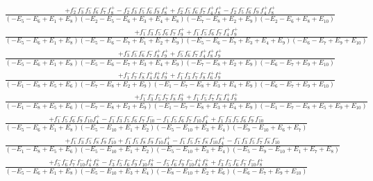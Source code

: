 \documentclass{article}
\begin{document}
\[\begin{array}{rcl}
\frac{+f_{2}^{-}f_{3}^{-}f_{5}^{-}f_{6}^{-}f_{7}^{-}f_{8}^{+}-f_{2}^{-}f_{3}^{-}f_{5}^{-}f_{6}^{-}f_{9}^{-}f_{8}^{+}+f_{2}^{-}f_{5}^{-}f_{6}^{-}f_{7}^{-}f_{4}^{+}f_{8}^{+}-f_{2}^{-}f_{5}^{-}f_{6}^{-}f_{9}^{-}f_{4}^{+}f_{8}^{+}}{(-E_{5}-E_{6}+E_{1}+E_{8})(-E_{2}-E_{5}-E_{6}+E_{3}+E_{4}+E_{8})(-E_{7}-E_{8}+E_{2}+E_{9})(-E_{2}-E_{6}+E_{8}+E_{10})}\\
\frac{+f_{1}^{-}f_{3}^{-}f_{5}^{-}f_{6}^{-}f_{7}^{-}f_{9}^{+}+f_{1}^{-}f_{5}^{-}f_{6}^{-}f_{7}^{-}f_{4}^{+}f_{9}^{+}}{(-E_{5}-E_{6}+E_{1}+E_{8})(-E_{5}-E_{6}-E_{7}+E_{1}+E_{2}+E_{9})(-E_{5}-E_{6}-E_{7}+E_{3}+E_{4}+E_{9})(-E_{6}-E_{7}+E_{9}+E_{10})}\\
\frac{+f_{3}^{-}f_{5}^{-}f_{6}^{-}f_{7}^{-}f_{8}^{+}f_{9}^{+}+f_{5}^{-}f_{6}^{-}f_{7}^{-}f_{4}^{+}f_{8}^{+}f_{9}^{+}}{(-E_{5}-E_{6}+E_{1}+E_{8})(-E_{5}-E_{6}-E_{7}+E_{3}+E_{4}+E_{9})(-E_{7}-E_{8}+E_{2}+E_{9})(-E_{6}-E_{7}+E_{9}+E_{10})}\\
\frac{+f_{1}^{-}f_{7}^{-}f_{8}^{-}f_{4}^{+}f_{6}^{+}f_{9}^{+}+f_{1}^{-}f_{3}^{-}f_{7}^{-}f_{8}^{-}f_{6}^{+}f_{9}^{+}}{(-E_{1}-E_{8}+E_{5}+E_{6})(-E_{7}-E_{8}+E_{2}+E_{9})(-E_{1}-E_{7}-E_{8}+E_{3}+E_{4}+E_{9})(-E_{6}-E_{7}+E_{9}+E_{10})}\\
\frac{+f_{1}^{-}f_{3}^{-}f_{5}^{-}f_{7}^{-}f_{8}^{-}f_{9}^{+}+f_{1}^{-}f_{5}^{-}f_{7}^{-}f_{8}^{-}f_{4}^{+}f_{9}^{+}}{(-E_{1}-E_{8}+E_{5}+E_{6})(-E_{7}-E_{8}+E_{2}+E_{9})(-E_{1}-E_{7}-E_{8}+E_{3}+E_{4}+E_{9})(-E_{1}-E_{7}-E_{8}+E_{5}+E_{9}+E_{10})}\\
\frac{+f_{1}^{-}f_{5}^{-}f_{6}^{-}f_{9}^{-}f_{10}^{-}f_{4}^{+}-f_{1}^{-}f_{3}^{-}f_{5}^{-}f_{6}^{-}f_{7}^{-}f_{10}^{-}-f_{1}^{-}f_{5}^{-}f_{6}^{-}f_{7}^{-}f_{10}^{-}f_{4}^{+}+f_{1}^{-}f_{3}^{-}f_{5}^{-}f_{6}^{-}f_{9}^{-}f_{10}^{-}}{(-E_{5}-E_{6}+E_{1}+E_{8})(-E_{5}-E_{10}+E_{1}+E_{2})(-E_{5}-E_{10}+E_{3}+E_{4})(-E_{9}-E_{10}+E_{6}+E_{7})}\\
\frac{+f_{1}^{-}f_{3}^{-}f_{5}^{-}f_{8}^{-}f_{9}^{-}f_{10}^{-}+f_{1}^{-}f_{5}^{-}f_{8}^{-}f_{9}^{-}f_{10}^{-}f_{4}^{+}-f_{1}^{-}f_{5}^{-}f_{7}^{-}f_{8}^{-}f_{10}^{-}f_{4}^{+}-f_{1}^{-}f_{3}^{-}f_{5}^{-}f_{7}^{-}f_{8}^{-}f_{10}^{-}}{(-E_{1}-E_{8}+E_{5}+E_{6})(-E_{5}-E_{10}+E_{1}+E_{2})(-E_{5}-E_{10}+E_{3}+E_{4})(-E_{5}-E_{9}-E_{10}+E_{1}+E_{7}+E_{8})}\\
\frac{+f_{5}^{-}f_{6}^{-}f_{7}^{-}f_{10}^{-}f_{4}^{+}f_{8}^{+}-f_{3}^{-}f_{5}^{-}f_{6}^{-}f_{9}^{-}f_{10}^{-}f_{8}^{+}-f_{5}^{-}f_{6}^{-}f_{9}^{-}f_{10}^{-}f_{4}^{+}f_{8}^{+}+f_{3}^{-}f_{5}^{-}f_{6}^{-}f_{7}^{-}f_{10}^{-}f_{8}^{+}}{(-E_{5}-E_{6}+E_{1}+E_{8})(-E_{5}-E_{10}+E_{3}+E_{4})(-E_{8}-E_{10}+E_{2}+E_{6})(-E_{6}-E_{7}+E_{9}+E_{10})}\\

\end{array}\]
\end{document}
